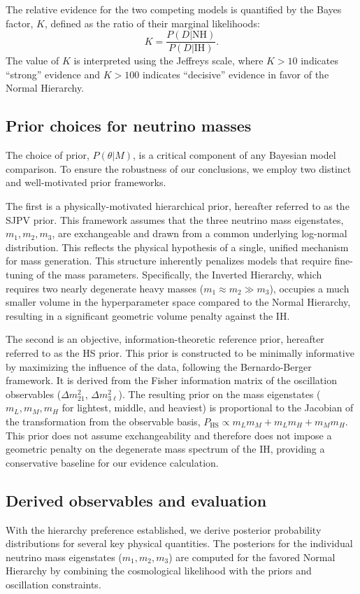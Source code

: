\documentclass[]{article}
\begin{document}
The relative evidence for the two competing models is quantified by the Bayes factor, $K$, defined as the ratio of their marginal likelihoods:
\begin{equation}
K = \frac{P(D|\text{NH})}{P(D|\text{IH})}.
\end{equation}
The value of $K$ is interpreted using the Jeffreys scale, where $K > 10$ indicates ``strong'' evidence and $K > 100$ indicates ``decisive'' evidence in favor of the Normal Hierarchy.

\subsection{Prior choices for neutrino masses}
The choice of prior, $P(\theta|M)$, is a critical component of any Bayesian model comparison. To ensure the robustness of our conclusions, we employ two distinct and well-motivated prior frameworks.

The first is a physically-motivated hierarchical prior, hereafter referred to as the SJPV prior. This framework assumes that the three neutrino mass eigenstates, $m_1, m_2, m_3$, are exchangeable and drawn from a common underlying log-normal distribution. This reflects the physical hypothesis of a single, unified mechanism for mass generation. This structure inherently penalizes models that require fine-tuning of the mass parameters. Specifically, the Inverted Hierarchy, which requires two nearly degenerate heavy masses ($m_1 \approx m_2 \gg m_3$), occupies a much smaller volume in the hyperparameter space compared to the Normal Hierarchy, resulting in a significant geometric volume penalty against the IH.

The second is an objective, information-theoretic reference prior, hereafter referred to as the HS prior. This prior is constructed to be minimally informative by maximizing the influence of the data, following the Bernardo-Berger framework. It is derived from the Fisher information matrix of the oscillation observables ($\Delta m^2_{21}$, $\Delta m^2_{3\ell}$). The resulting prior on the mass eigenstates ($m_L, m_M, m_H$ for lightest, middle, and heaviest) is proportional to the Jacobian of the transformation from the observable basis, $P_{\text{HS}} \propto m_L m_M + m_L m_H + m_M m_H$. This prior does not assume exchangeability and therefore does not impose a geometric penalty on the degenerate mass spectrum of the IH, providing a conservative baseline for our evidence calculation.

\subsection{Derived observables and evaluation}
With the hierarchy preference established, we derive posterior probability distributions for several key physical quantities. The posteriors for the individual neutrino mass eigenstates ($m_1, m_2, m_3$) are computed for the favored Normal Hierarchy by combining the cosmological likelihood with the priors and oscillation constraints.
\end{document}
